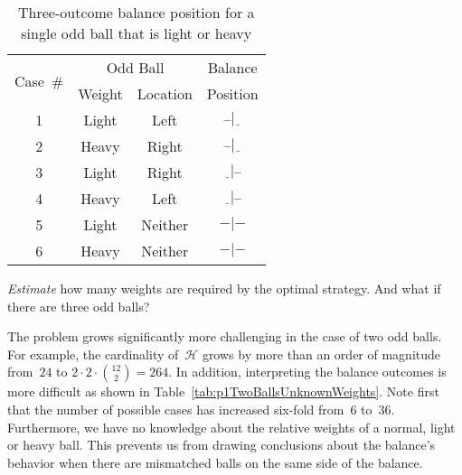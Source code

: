   \begin{table}[H]
    \centering
    \caption{Three-outcome balance position for a \\single odd ball that is light or heavy}\label{tab:p1OneBallTable}
    \begin{tabular}{|c||c|c||c|}
      \hline
      \multirow{2}{*}{Case~\#} &  \multicolumn{2}{c||}{Odd Ball} & Balance\\\cline{2-3}
      &  Weight  &  Location &  Position  \\ \hline\hline
      1   &  Light   &  Left     &  $\bar{~}\bar{~}|\underline{~~}$ \\ \hline
      2   &  Heavy   &  Right    &  $\bar{~}\bar{~}|\underline{~~}$ \\ \hline\hline
      3   &  Light   &  Right    &  $\underline{~~}|\bar{~}\bar{~}$ \\ \hline
      4   &  Heavy   &  Left     &  $\underline{~~}|\bar{~}\bar{~}$ \\ \hline\hline
      5   &  Light   &  Neither  &  $-|-$ \\ \hline
      6   &  Heavy   &  Neither  &  $-|-$ \\ \hline
    \end{tabular}
  \end{table}


\begin{subproblem}
  \textit{Estimate} how many weights are required by the optimal strategy.  And what if there are three odd balls?
\end{subproblem}

  The problem grows significantly more challenging in the case of two odd balls.  For example, the cardinality of~$\mathcal{H}$ grows by more than an order of magnitude from~$24$ to ${2\cdot2\cdot\binom{12}{2} = 264}$. In addition, interpreting the balance outcomes is more difficult as shown in Table~\ref{tab:p1TwoBallsUnknownWeights}.  Note first that the number of possible cases has increased six-fold from~6 to~36.  Furthermore, we have no knowledge about the relative weights of a normal, light or heavy ball.  This prevents us from drawing conclusions about the balance's behavior when there are mismatched balls on the same side of the balance.
  
